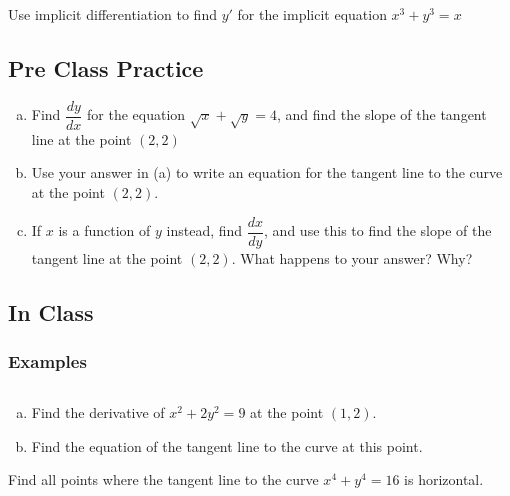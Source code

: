 \documentclass[notes]{subfiles}
\begin{document}
		\begin{ex}
			Use implicit differentiation to find \(y'\) for the implicit equation \(x^3 + y^3 = x\)
		\end{ex}	
			\newpage

	\subsection*{Pre Class Practice}
		\begin{ex}
			\begin{enumerate}[(a)]
				\item Find \(\dfrac{dy}{dx}\) for the equation \(\sqrt{x} + \sqrt{y} = 4\), and find the slope of the tangent line at the point \((2,2)\)
					
				\item Use your answer in (a) to write an equation for the tangent line to the curve at the point $(2,2)$.
					
				\item If \(x\) is a function of \(y\) instead, find \(\dfrac{dx}{dy}\), and use this to find the slope of the tangent line at the point \((2,2)\). What happens to your answer? Why?
			\end{enumerate}
		\end{ex}	
			\newpage
	
	\subsection*{In Class}		
	\subsubsection*{Examples}
		\begin{ex} \( \)
			\begin{enumerate}[(a)] 
				\item Find the derivative of \(x^2 + 2y^2 = 9\) at the point \((1,2)\).
					\vs{1}
					
				\item Find the equation of the tangent line to the curve at this point.
					\vs{1}
					
			\end{enumerate}
		\end{ex}
		
		\begin{ex}
			Find all points where the tangent line to the curve $x^4 + y^4 = 16$ is horizontal.
		\end{ex}
			\vs{2}
			\newpage
			
\end{document}
